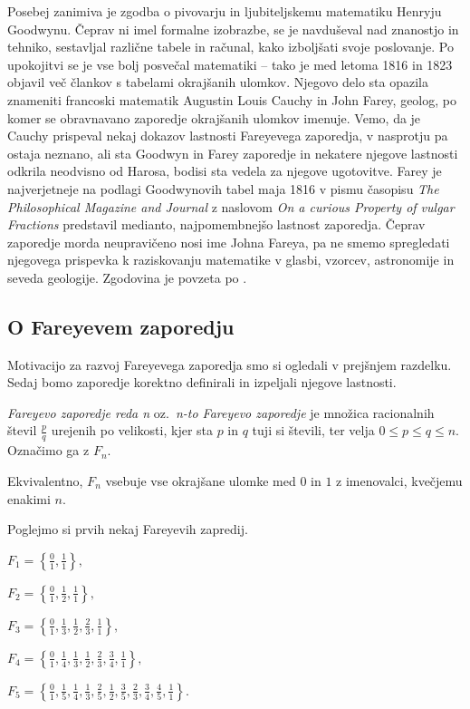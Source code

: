 \documentclass[mat1]{fmfdelo}
\begin{document}
Posebej zanimiva je zgodba o pivovarju in ljubiteljskemu matematiku Henryju Goodwynu. Čeprav ni imel formalne izobrazbe, se je navduševal nad znanostjo in tehniko, sestavljal različne tabele in računal, kako izboljšati svoje poslovanje. Po upokojitvi se je vse bolj posvečal matematiki -- tako je med letoma 1816 in 1823 objavil več člankov s tabelami okrajšanih ulomkov. Njegovo delo sta opazila znameniti francoski matematik Augustin Louis Cauchy in John Farey, geolog, po komer se obravnavano zaporedje okrajšanih ulomkov imenuje. Vemo, da je Cauchy prispeval nekaj dokazov lastnosti Fareyevega zaporedja, v nasprotju pa ostaja neznano, ali sta Goodwyn in Farey zaporedje in nekatere njegove lastnosti odkrila neodvisno od Harosa, bodisi sta vedela za njegove ugotovitve. Farey je najverjetneje na podlagi Goodwynovih tabel maja 1816 v pismu časopisu \emph{The Philosophical Magazine and Journal} z naslovom \emph{On a curious Property of vulgar Fractions} predstavil medianto, najpomembnejšo lastnost zaporedja. Čeprav zaporedje morda neupravičeno nosi ime Johna Fareya, pa ne smemo spregledati njegovega prispevka k raziskovanju matematike v glasbi, vzorcev, astronomije in seveda geologije. Zgodovina je povzeta po \cite[poglavje 2]{motifofmath}.

%
\subsection{O Fareyevem zaporedju}

Motivacijo za razvoj Fareyevega zaporedja smo si ogledali v prejšnjem razdelku. Sedaj bomo zaporedje korektno definirali in izpeljali njegove lastnosti.

\begin{definicija}
\label{def:Farey}
\emph{Fareyevo zaporedje reda n} oz.\ \emph{n-to Fareyevo zaporedje} je množica racionalnih števil $\frac{p}{q}$ urejenih po velikosti, kjer sta $p$ in $q$ tuji si števili, ter velja $0 \leq p \leq q \leq n$. Označimo ga z $F_n$.

Ekvivalentno, $F_n$ vsebuje vse okrajšane ulomke med $0$ in $1$ z imenovalci, kvečjemu enakimi $n$.
\end{definicija}

\begin{primer}
Poglejmo si prvih nekaj Fareyevih zapredij.

\(F_1 = \left \{\frac{0}{1}, \frac{1}{1} \right \}, \)

\(F_2 = \left \{\frac{0}{1}, \frac{1}{2}, \frac{1}{1} \right \}, \)

\(F_3 = \left \{\frac{0}{1}, \frac{1}{3}, \frac{1}{2}, \frac{2}{3}, \frac{1}{1} \right \}, \)

\(F_4 = \left \{\frac{0}{1}, \frac{1}{4}, \frac{1}{3}, \frac{1}{2}, \frac{2}{3}, \frac{3}{4}, \frac{1}{1} \right \}, \)

\(F_5 = \left \{\frac{0}{1}, \frac{1}{5}, \frac{1}{4}, \frac{1}{3}, \frac{2}{5}, \frac{1}{2}, \frac{3}{5}, \frac{2}{3}, \frac{3}{4}, \frac{4}{5}, \frac{1}{1}\right \}. \)
\end{primer}
\end{document}
